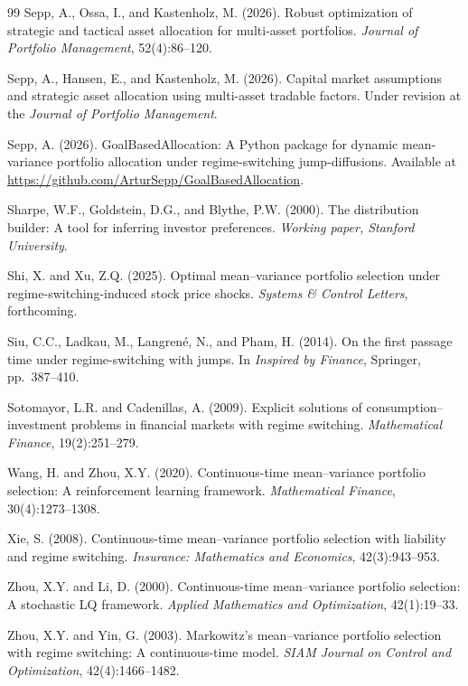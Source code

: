\documentclass[11pt,a4paper]{article}
\numberwithin{equation}{section}
\begin{document}
\begin{thebibliography}{99}
Sepp, A., Ossa, I., and Kastenholz, M. (2026). Robust optimization of strategic and tactical asset allocation for multi-asset portfolios. \textit{Journal of Portfolio Management}, 52(4):86--120.

Sepp, A., Hansen, E., and Kastenholz, M. (2026). Capital market assumptions and strategic asset allocation using multi-asset tradable factors. Under revision at the \textit{Journal of Portfolio Management}.

Sepp, A. (2026). GoalBasedAllocation: A Python package for dynamic mean-variance 
portfolio allocation under regime-switching jump-diffusions. Available at 
\url{https://github.com/ArturSepp/GoalBasedAllocation}.


Sharpe, W.F., Goldstein, D.G., and Blythe, P.W. (2000). The distribution builder: A tool for inferring investor preferences. \textit{Working paper, Stanford University}.

Shi, X. and Xu, Z.Q. (2025). Optimal mean--variance portfolio selection under regime-switching-induced stock price shocks. \textit{Systems \& Control Letters}, forthcoming.

Siu, C.C., Ladkau, M., Langren\'e, N., and Pham, H. (2014). On the first passage time under regime-switching with jumps. In \textit{Inspired by Finance}, Springer, pp.~387--410.

Sotomayor, L.R. and Cadenillas, A. (2009). Explicit solutions of consumption--investment problems in financial markets with regime switching. \textit{Mathematical Finance}, 19(2):251--279.

Wang, H. and Zhou, X.Y. (2020). Continuous-time mean--variance portfolio selection: A reinforcement learning framework. \textit{Mathematical Finance}, 30(4):1273--1308.

Xie, S. (2008). Continuous-time mean--variance portfolio selection with liability and regime switching. \textit{Insurance: Mathematics and Economics}, 42(3):943--953.

Zhou, X.Y. and Li, D. (2000). Continuous-time mean--variance portfolio selection: A stochastic LQ framework. \textit{Applied Mathematics and Optimization}, 42(1):19--33.

Zhou, X.Y. and Yin, G. (2003). Markowitz's mean--variance portfolio selection with regime switching: A continuous-time model. \textit{SIAM Journal on Control and Optimization}, 42(4):1466--1482.

\end{thebibliography}
\end{document}
